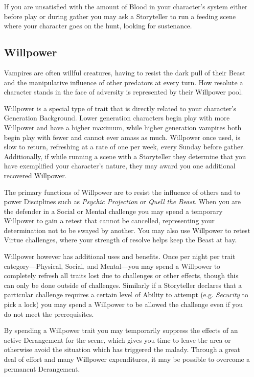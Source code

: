 If you are unsatisfied with the amount of Blood in your character's system either 
before play or during gather you may ask a Storyteller to run a feeding scene where 
your character goes on the hunt, looking for sustenance.

\subsection{Willpower}
\label{subsec:willpower}
Vampires are often willful creatures, having to resist the dark pull of their 
Beast and the manipulative influence of other predators at every turn.  How 
resolute a character stands in the face of adversity is represented by their 
Willpower pool.

Willpower is a special type of trait that is directly related to your character's 
Generation Background.  Lower generation characters begin play with more Willpower 
and have a higher maximum, while higher generation vampires both begin play with 
fewer and cannot ever amass as much.  Willpower once used, is slow to return, 
refreshing at a rate of one per week, every Sunday before gather.  Additionally, if 
while running a scene with a Storyteller they determine that you have exemplified 
your character's nature, they may award you one additional recovered Willpower.

The primary functions of Willpower are to resist the influence of others and to 
power Disciplines such as \emph{Psychic Projection} or \emph{Quell the Beast}.  
When you are the defender in a Social or Mental challenge you may spend a temporary 
Willpower to gain a retest that cannot be cancelled, representing your determination 
not to be swayed by another.  You may also use Willpower to retest Virtue challenges, 
where your strength of resolve helps keep the Beast at bay.

Willpower however has additional uses and benefits.  Once per night per trait 
category---Physical, Social, and Mental---you may spend a Willpower to completely 
refresh all traits lost due to challenges or other effects, though this can only 
be done outside of challenges.  Similarly if a Storyteller declares that a particular 
challenge requires a certain level of Ability to attempt (e.g. \emph{Security} to pick 
a lock) you may spend a Willpower to be allowed the challenge even if you do not meet 
the prerequisites.

By spending a Willpower trait you may temporarily suppress the effects of an active 
Derangement for the scene, which gives you time to leave the area or otherwise avoid 
the situation which has triggered the malady.  Through a great deal of effort and many 
Willpower expenditures, it may be possible to overcome a permanent Derangement.

